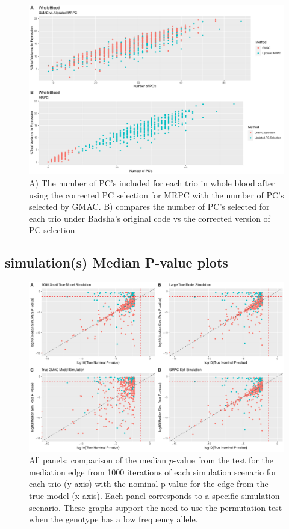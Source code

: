 \documentclass[
]{article}
\begin{document}
\begin{figure}
\centering
\includegraphics{12_15_2021_GMAC_plots_all_trios_files/figure-latex/unnamed-chunk-4-1.pdf}
\caption{A) The number of PC's included for each trio in whole blood
after using the corrected PC selection for MRPC with the number of PC's
selected by GMAC. B) compares the number of PC's selected for each trio
under Badsha's original code vs the corrected version of PC selection}
\end{figure}

\hypertarget{simulations-median-p-value-plots}{%
\subsection{simulation(s) Median P-value
plots}\label{simulations-median-p-value-plots}}

\begin{figure}
\centering
\includegraphics{12_15_2021_GMAC_plots_all_trios_files/figure-latex/unnamed-chunk-5-1.pdf}
\caption{All panels: comparison of the median \(p\)-value from the test
for the mediation edge from 1000 iterations of each simulation scenario
for each trio (y-axis) with the nominal p-value for the edge from the
true model (x-axis). Each panel corresponds to a specific simulation
scenario. These graphs support the need to use the permutation test when
the genotype has a low frequency allele.}
\end{figure}
\end{document}
